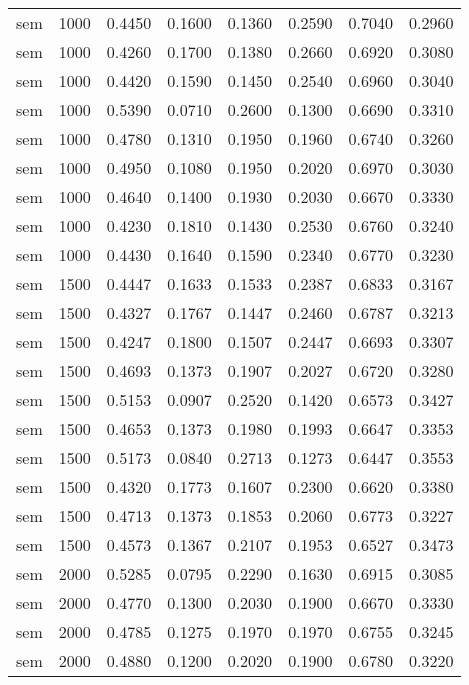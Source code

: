 \begin{scriptsize}
\begin{longtable}{cccccccc}
		sem      & 1000 & 0.4450 & 0.1600 & 0.1360 & 0.2590 & 0.7040 & 0.2960 \\
		sem      & 1000 & 0.4260 & 0.1700 & 0.1380 & 0.2660 & 0.6920 & 0.3080 \\
		sem      & 1000 & 0.4420 & 0.1590 & 0.1450 & 0.2540 & 0.6960 & 0.3040 \\
		sem      & 1000 & 0.5390 & 0.0710 & 0.2600 & 0.1300 & 0.6690 & 0.3310 \\
		sem      & 1000 & 0.4780 & 0.1310 & 0.1950 & 0.1960 & 0.6740 & 0.3260 \\
		sem      & 1000 & 0.4950 & 0.1080 & 0.1950 & 0.2020 & 0.6970 & 0.3030 \\
		sem      & 1000 & 0.4640 & 0.1400 & 0.1930 & 0.2030 & 0.6670 & 0.3330 \\
		sem      & 1000 & 0.4230 & 0.1810 & 0.1430 & 0.2530 & 0.6760 & 0.3240 \\
		sem      & 1000 & 0.4430 & 0.1640 & 0.1590 & 0.2340 & 0.6770 & 0.3230 \\
		sem      & 1500 & 0.4447 & 0.1633 & 0.1533 & 0.2387 & 0.6833 & 0.3167 \\
		sem      & 1500 & 0.4327 & 0.1767 & 0.1447 & 0.2460 & 0.6787 & 0.3213 \\
		sem      & 1500 & 0.4247 & 0.1800 & 0.1507 & 0.2447 & 0.6693 & 0.3307 \\
		sem      & 1500 & 0.4693 & 0.1373 & 0.1907 & 0.2027 & 0.6720 & 0.3280 \\
		sem      & 1500 & 0.5153 & 0.0907 & 0.2520 & 0.1420 & 0.6573 & 0.3427 \\
		sem      & 1500 & 0.4653 & 0.1373 & 0.1980 & 0.1993 & 0.6647 & 0.3353 \\
		sem      & 1500 & 0.5173 & 0.0840 & 0.2713 & 0.1273 & 0.6447 & 0.3553 \\
		sem      & 1500 & 0.4320 & 0.1773 & 0.1607 & 0.2300 & 0.6620 & 0.3380 \\
		sem      & 1500 & 0.4713 & 0.1373 & 0.1853 & 0.2060 & 0.6773 & 0.3227 \\
		sem      & 1500 & 0.4573 & 0.1367 & 0.2107 & 0.1953 & 0.6527 & 0.3473 \\
		sem      & 2000 & 0.5285 & 0.0795 & 0.2290 & 0.1630 & 0.6915 & 0.3085 \\
		sem      & 2000 & 0.4770 & 0.1300 & 0.2030 & 0.1900 & 0.6670 & 0.3330 \\
		sem      & 2000 & 0.4785 & 0.1275 & 0.1970 & 0.1970 & 0.6755 & 0.3245 \\
		sem      & 2000 & 0.4880 & 0.1200 & 0.2020 & 0.1900 & 0.6780 & 0.3220 \\

\end{longtable}
\end{scriptsize}
